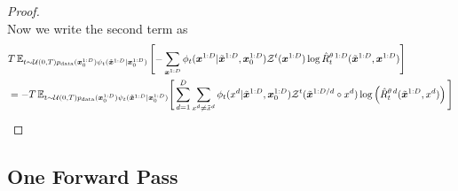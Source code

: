 \documentclass{article}
\begin{document}
\begin{proof}
\begin{equation}
\end{equation}
Now we write the second term as
\begin{align}
    &T \, \mathbb{E}_{t\sim \mathcal{U}(0, T) p_{\textup{data}}(\bm{x}_0^{1:D}) \psi_t(\tilde{\bm{x}}^{1:D} | \bm{x}_0^{1:D})} \left[ - \sum_{\bm{x}^{1:D}} \phi_t(\bm{x}^{1:D} | \tilde{\bm{x}}^{1:D}, \bm{x}_0^{1:D}) \mathcal{Z}^t(\bm{x}^{1:D}) \log \hat{R}_t^{\theta \, 1:D}(\tilde{\bm{x}}^{1:D}, \bm{x}^{1:D}) \right]\\
   &= - T \, \mathbb{E}_{t\sim \mathcal{U}(0, T) p_{\textup{data}}(\bm{x}_0^{1:D}) \psi_t(\tilde{\bm{x}}^{1:D} | \bm{x}_0^{1:D})} \Bigg[ \sum_{d=1}^D \sum_{x^d \neq \tilde{x}^d} \phi_t(x^d | \tilde{\bm{x}}^{1:D}, \bm{x}_0^{1:D}) \mathcal{Z}^t(\tilde{\bm{x}}^{1:D/d} \circ x^d) \log \left( \hat{R}_t^{\theta \, d}(\tilde{\bm{x}}^{1:D}, x^d) \right) \Bigg]
\end{align}
\end{proof}


\subsection{One Forward Pass} \label{sec:ApdxCTELBOOneForwardPass}
\end{document}
